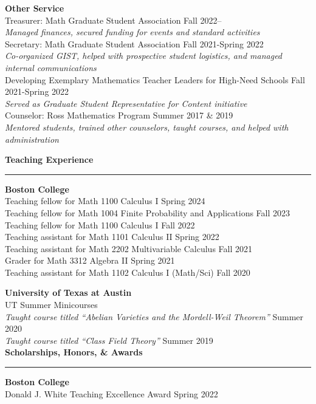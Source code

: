 \documentclass[11pt]{article}
\newenvironment{mysection}{
\color{mygreen}\bfseries\large
}
{
\\ \rule{\textwidth}{1pt}\hspace{-.25em}
} %
\begin{document}
\textbf{Other Service} \\
Treasurer: Math Graduate Student Association \hfill Fall 2022-- \\
\textit{Managed finances, secured funding for events and standard activities} \\
Secretary: Math Graduate Student Association \hfill Fall 2021-Spring 2022 \\
\textit{Co-organized GIST, helped with prospective student logistics, and managed internal communications} \\
Developing Exemplary Mathematics Teacher Leaders for High-Need Schools \hfill Fall 2021-Spring 2022\\
\textit{Served as Graduate Student Representative for Content initiative} \\
Counselor: Ross Mathematics Program \hfill Summer 2017 \& 2019 \\
\textit{Mentored students, trained other counselors, taught courses, and helped with administration} \\

\newpage

\begin{mysection}Teaching Experience\end{mysection}
\textbf{Boston College} \\
Teaching fellow for Math 1100 Calculus I \hfill Spring 2024 \\
Teaching fellow for Math 1004 Finite Probability and Applications \hfill Fall 2023 \\
Teaching fellow for Math 1100 Calculus I \hfill Fall 2022 \\
Teaching assistant for Math 1101 Calculus II \hfill Spring 2022 \\
Teaching assistant for Math 2202 Multivariable Calculus \hfill Fall 2021 \\
Grader for Math 3312 Algebra II \hfill Spring 2021 \\
Teaching assistant for Math 1102 Calculus I (Math/Sci) \hfill Fall 2020

\textbf{University of Texas at Austin} \\
UT Summer Minicourses \\
\textit{Taught course titled ``Abelian Varieties and the Mordell-Weil Theorem''} \hfill Summer 2020 \\
\textit{Taught course titled ``Class Field Theory''} \hfill Summer 2019 \\

\begin{mysection}Scholarships, Honors, \& Awards\end{mysection}
\textbf{Boston College} \\
Donald J. White Teaching Excellence Award \hfill Spring 2022
\end{document}
